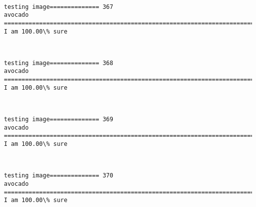 \documentclass[11pt]{article}
\begin{document}
    \begin{center}
    \end{center}
    { \hspace*{\fill} \\}
    
    \begin{Verbatim}[commandchars=\\\{\}]
testing image============== 367
avocado
============================================================================
I am 100.00\% sure

    \end{Verbatim}

    \begin{center}
    \end{center}
    { \hspace*{\fill} \\}
    
    \begin{Verbatim}[commandchars=\\\{\}]
testing image============== 368
avocado
============================================================================
I am 100.00\% sure

    \end{Verbatim}

    \begin{center}
    \end{center}
    { \hspace*{\fill} \\}
    
    \begin{Verbatim}[commandchars=\\\{\}]
testing image============== 369
avocado
============================================================================
I am 100.00\% sure

    \end{Verbatim}

    \begin{center}
    \end{center}
    { \hspace*{\fill} \\}
    
    \begin{Verbatim}[commandchars=\\\{\}]
testing image============== 370
avocado
============================================================================
I am 100.00\% sure

    \end{Verbatim}
\end{document}
